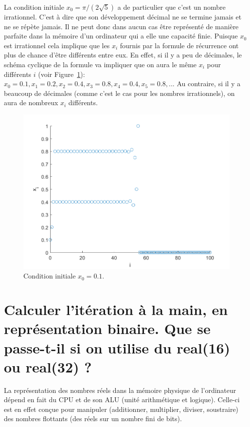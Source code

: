 \documentclass[a4paper, 12pt]{report}
\begin{document}
La condition initiale $x_0 = \pi/(2 \sqrt{5})$ a de particulier que
c'est un nombre irrationnel. C'est à dire que son développement décimal ne
se termine jamais et ne se répète jamais. Il ne peut donc dans aucun cas
être représenté de manière parfaite dans la mémoire d'un ordinateur qui a elle
une capacité finie. Puisque $x_0$ est irrationnel cela implique que les $x_i$
fournis par la formule de récurrence ont plus de chance d'être différents entre
eux. En effet, si il y a peu de décimales, le schéma cyclique de la formule
va impliquer que on aura le même $x_i$ pour différents $i$ (voir Figure~\ref{fig:predict_x0_0_dot_1}): $x_0=0.1, x_1 = 0.2,x_2 = 0.4,x_3 = 0.8, x_4=0.4, x_5=0.8,...$
Au contraire, si il y a beaucoup de décimales (comme c'est le cas pour
les nombres irrationnels), on aura de nombreux $x_i$ différents.

\begin{figure}[H]
    \centering
    \includegraphics{images/x0_0dot1_i_x_i.png}
    \caption{Condition initiale $x_0 = 0.1$.}
    \label{fig:predict_x0_0_dot_1}
\end{figure}

\section{Calculer l'itération à la main, en représentation binaire.
Que se passe-t-il si on utilise du real(16) ou real(32) ?}

La représentation des nombres réels dans la mémoire physique de l'ordinateur dépend
en fait du CPU et de son ALU (unité arithmétique et logique). Celle-ci est
en effet conçue pour manipuler (additionner, multiplier, diviser, soustraire)
des nombres flottants (des réels sur un nombre fini de bits).
\end{document}
